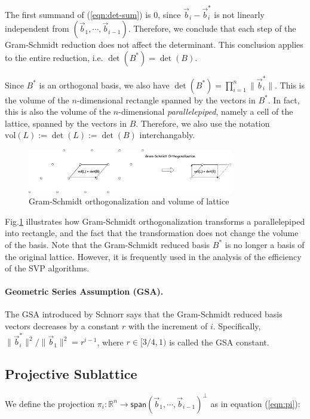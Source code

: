 \documentclass[11pt]{article}
\newcommand{\bbR}{\mathbb{R}}
\newcommand{\vb}{\vec{b}}
\newcommand{\sspan}{\mathsf{span}}
\newcommand{\vol}{\mathrm{vol}}
\begin{document}
The first summand of (\ref{eqn:det-sum}) is $0$, since $\vb_i-\vb_i^*$ is not linearly independent from $(\vb_1,\cdots,\vb_{i-1})$.
Therefore, we conclude that each step of the Gram-Schmidt reduction does not affect the determinant.
This conclusion applies to the entire reduction, i.e. $\det(B^*)=\det(B)$.

Since $B^*$ is an orthogonal basis, we also have $\det(B^*)=\prod_{i=1}^n \|\vb_i^*\|$.
This is the volume of the $n$-dimensional rectangle spanned by the vectors in $B^*$.
In fact, this is also the volume of the $n$-dimensional \emph{parallelepiped}, namely a cell of the lattice, spanned by the vectors in $B$.
Therefore, we also use the notation $\vol(L):=\det(L):=\det(B)$ interchangably.

\begin{figure}[ht!]
\includegraphics[width=0.8\textwidth]{files/BKZ-Volume.png}
\caption{Gram-Schmidt orthogonalization and volume of lattice}
\label{fig:bkz.volume}
\end{figure}

Fig.\ref{fig:bkz.volume} illustrates how Gram-Schmidt orthogonalization transforms a parallelepiped into rectangle, and the fact that the transformation does not change the volume of the basis.
Note that the Gram-Schmidt reduced basis $B^*$ is no longer a basis of the original lattice.
However, it is frequently used in the analysis of the efficiency of the SVP algorithms.

\paragraph{Geometric Series Assumption (GSA).} The GSA introduced by Schnorr says that the Gram-Schmidt reduced basis vectors decreases by a constant $r$ with the increment of $i$.
Specifically, $\|\vb_i^*\|^2/\|\vb_1\|^2=r^{i-1}$, where $r\in[3/4,1)$ is called the GSA constant.


\subsection{Projective Sublattice}

We define the projection $\pi_i:\bbR^n\to\sspan(\vb_1,\cdots,\vb_{i-1})^{\perp}$ as in equation (\ref{eqn:pi}):
\end{document}
